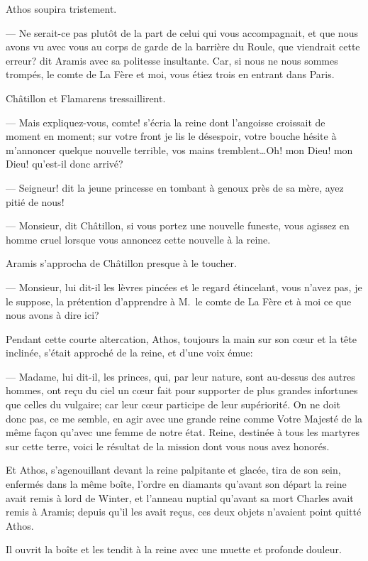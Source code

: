 Athos soupira tristement.

— Ne serait-ce pas plutôt de la part de celui qui vous accompagnait, et que nous avons vu avec vous au corps de garde de la barrière du Roule, que viendrait cette erreur? dit Aramis avec sa politesse insultante. Car, si nous ne nous sommes trompés, le comte de La Fère et moi, vous étiez trois en entrant dans Paris.

Châtillon et Flamarens tressaillirent.

— Mais expliquez-vous, comte! s'écria la reine dont l'angoisse croissait de moment en moment; sur votre front je lis le désespoir, votre bouche hésite à m'annoncer quelque nouvelle terrible, vos mains tremblent\dots Oh! mon Dieu! mon Dieu! qu'est-il donc arrivé?

— Seigneur! dit la jeune princesse en tombant à genoux près de sa mère, ayez pitié de nous!

— Monsieur, dit Châtillon, si vous portez une nouvelle funeste, vous agissez en homme cruel lorsque vous annoncez cette nouvelle à la reine.

Aramis s'approcha de Châtillon presque à le toucher.

— Monsieur, lui dit-il les lèvres pincées et le regard étincelant, vous n'avez pas, je le suppose, la prétention d'apprendre à M.~le comte de La Fère et à moi ce que nous avons à dire ici?

Pendant cette courte altercation, Athos, toujours la main sur son cœur et la tête inclinée, s'était approché de la reine, et d'une voix émue:

— Madame, lui dit-il, les princes, qui, par leur nature, sont au-dessus des autres hommes, ont reçu du ciel un cœur fait pour supporter de plus grandes infortunes que celles du vulgaire; car leur cœur participe de leur supériorité. On ne doit donc pas, ce me semble, en agir avec une grande reine comme Votre Majesté de la même façon qu'avec une femme de notre état. Reine, destinée à tous les martyres sur cette terre, voici le résultat de la mission dont vous nous avez honorés.

Et Athos, s'agenouillant devant la reine palpitante et glacée, tira de son sein, enfermés dans la même boîte, l'ordre en diamants qu'avant son départ la reine avait remis à lord de Winter, et l'anneau nuptial qu'avant sa mort Charles avait remis à Aramis; depuis qu'il les avait reçus, ces deux objets n'avaient point quitté Athos.

Il ouvrit la boîte et les tendit à la reine avec une muette et profonde douleur.

